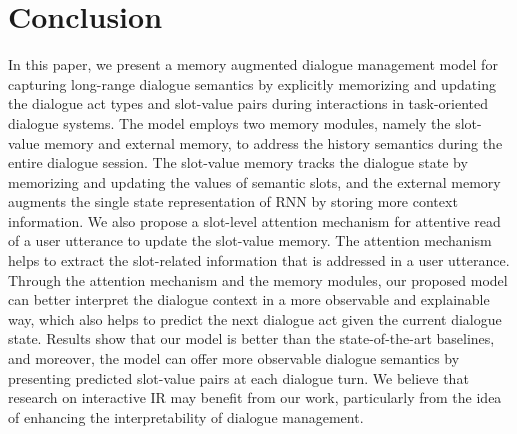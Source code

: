


\section{Conclusion}
In this paper, we present a memory augmented dialogue management model for capturing long-range dialogue semantics by explicitly memorizing and updating the dialogue act types and slot-value pairs during interactions in task-oriented dialogue systems. 
The model employs two memory modules, namely the slot-value memory and external memory, to address the history semantics during the entire dialogue session. The slot-value memory tracks the dialogue state by memorizing and updating the values of semantic slots, and the external memory augments the single state representation of RNN by storing more context information.
We also propose a slot-level attention mechanism for attentive read of a user utterance to update the slot-value memory. The attention mechanism helps to extract the slot-related information that is addressed in a user utterance. 
Through the attention mechanism and the memory modules, our proposed model can better interpret the dialogue context in a more observable and explainable way, which also helps to predict the next dialogue act given the current dialogue state.
Results show that our model is better than the state-of-the-art baselines, and moreover, the model can offer more observable dialogue semantics by presenting
predicted slot-value pairs at each dialogue turn.
We believe that research on interactive IR may benefit from our work, particularly from the idea of enhancing the interpretability of dialogue management.






